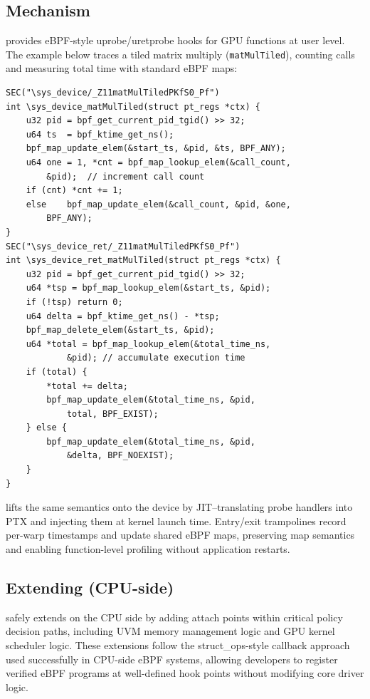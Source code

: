 \subsection{\sysdevice Mechanism}\label{sec:\sys_device}

\noindent \sysdevice provides eBPF-style uprobe/uretprobe hooks for GPU functions at user level. The example below traces a tiled matrix multiply (\texttt{matMulTiled}), counting calls and measuring total time with standard eBPF maps:

\begin{verbatim}
SEC("\sys_device/_Z11matMulTiledPKfS0_Pf")
int \sys_device_matMulTiled(struct pt_regs *ctx) {
    u32 pid = bpf_get_current_pid_tgid() >> 32;
    u64 ts  = bpf_ktime_get_ns();
    bpf_map_update_elem(&start_ts, &pid, &ts, BPF_ANY);
    u64 one = 1, *cnt = bpf_map_lookup_elem(&call_count,
        &pid);  // increment call count
    if (cnt) *cnt += 1;
    else    bpf_map_update_elem(&call_count, &pid, &one,
        BPF_ANY);
}
SEC("\sys_device_ret/_Z11matMulTiledPKfS0_Pf")
int \sys_device_ret_matMulTiled(struct pt_regs *ctx) {
    u32 pid = bpf_get_current_pid_tgid() >> 32;
    u64 *tsp = bpf_map_lookup_elem(&start_ts, &pid);
    if (!tsp) return 0;
    u64 delta = bpf_ktime_get_ns() - *tsp;
    bpf_map_delete_elem(&start_ts, &pid);
    u64 *total = bpf_map_lookup_elem(&total_time_ns,
            &pid); // accumulate execution time
    if (total) {
        *total += delta;
        bpf_map_update_elem(&total_time_ns, &pid,
            total, BPF_EXIST);
    } else {
        bpf_map_update_elem(&total_time_ns, &pid,
            &delta, BPF_NOEXIST);
    }
}
\end{verbatim}

\noindent \sysdevice lifts the same semantics onto the device by JIT--translating probe handlers into PTX and injecting them at kernel launch time. Entry/exit trampolines record per-warp timestamps and update shared eBPF maps, preserving map semantics and enabling function-level profiling without application restarts.

\subsection{Extending \sysdriver (CPU-side)}

\sys safely extends \sysdriver on the CPU side by adding attach points within critical policy decision paths, including UVM memory management logic and GPU kernel scheduler logic. These extensions follow the struct\_ops-style callback approach used successfully in CPU-side eBPF systems, allowing developers to register verified eBPF programs at well-defined hook points without modifying core driver logic.

